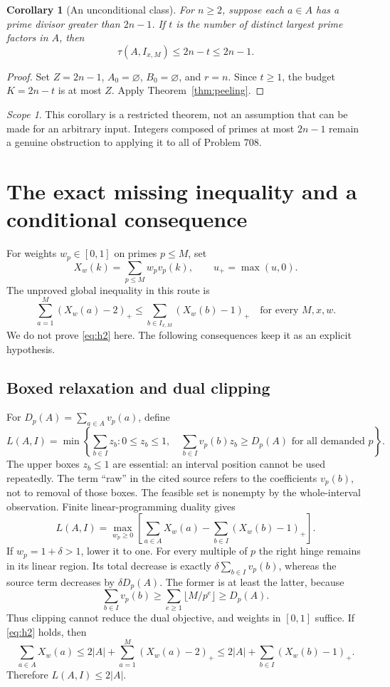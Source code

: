 \documentclass[11pt,a4paper]{article}
\newtheorem{corollary}[theorem]{Corollary}
\theoremstyle{remark}
\newtheorem*{remark}{Scope}
\newcommand{\pos}[1]{\left(#1\right)_+}
\newcommand{\II}{I_{x,M}}
\begin{document}
\begin{corollary}[An unconditional class]\label{cor:rough}
For $n\ge2$, suppose each $a\in A$ has a prime divisor greater than
$2n-1$. If $t$ is the number of distinct largest prime factors in $A$,
then
\[
 \tau(A,\II)\le2n-t\le2n-1.
\]
\end{corollary}
\begin{proof}
Set $Z=2n-1$, $A_0=\varnothing$, $B_0=\varnothing$, and $r=n$.
Since $t\ge1$, the budget $K=2n-t$ is at most $Z$. Apply
Theorem~\ref{thm:peeling}.
\end{proof}
\begin{remark}
This corollary is a restricted theorem, not an assumption that can be
made for an arbitrary input. Integers composed of primes at most $2n-1$
remain a genuine obstruction to applying it to all of Problem 708.
\end{remark}

\section{The exact missing inequality and a conditional consequence}
For weights $w_p\in[0,1]$ on primes $p\le M$, set
\[
 X_w(k)=\sum_{p\le M}w_pv_p(k),\qquad u_+=\max(u,0).
\]
The unproved global inequality in this route is
\begin{equation}\tag{$H_2$}\label{eq:h2}
 \sum_{a=1}^{M}\pos{X_w(a)-2}
 \le \sum_{b\in\II}\pos{X_w(b)-1}
 \quad\text{for every }M,x,w.
\end{equation}
We do not prove \eqref{eq:h2} here. The following consequences keep it
as an explicit hypothesis.

\subsection{Boxed relaxation and dual clipping}
For $D_p(A)=\sum_{a\in A}v_p(a)$, define
\[
 L(A,I)=\min\left\{\sum_{b\in I}z_b:
 0\le z_b\le1,\quad\sum_{b\in I}v_p(b)z_b\ge D_p(A)
 \text{ for all demanded }p\right\}.
\]
The upper boxes $z_b\le1$ are essential: an interval position cannot be
used repeatedly. The term ``raw'' in the cited source refers to the
coefficients $v_p(b)$, not to removal of those boxes.
The feasible set is nonempty by the whole-interval observation. Finite
linear-programming duality gives
\begin{equation}\label{eq:dual}
 L(A,I)=\max_{w_p\ge0}\left[
  \sum_{a\in A}X_w(a)-\sum_{b\in I}\pos{X_w(b)-1}\right].
\end{equation}
If $w_p=1+\delta>1$, lower it to one. For every multiple of $p$ the
right hinge remains in its linear region. Its total decrease is exactly
$\delta\sum_{b\in I}v_p(b)$, whereas the source term decreases by
$\delta D_p(A)$. The former is at least the latter, because
\[
 \sum_{b\in I}v_p(b)
 \ge\sum_{e\ge1}\lfloor M/p^e\rfloor
 \ge D_p(A).
\]
Thus clipping cannot reduce the dual objective, and weights in $[0,1]$
suffice. If \eqref{eq:h2} holds, then
\[
 \sum_{a\in A}X_w(a)
 \le 2|A|+\sum_{a=1}^M\pos{X_w(a)-2}
 \le 2|A|+\sum_{b\in I}\pos{X_w(b)-1}.
\]
Therefore $L(A,I)\le2|A|$.
\end{document}
